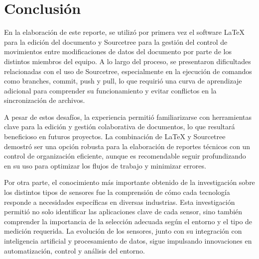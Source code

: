 \section{Conclusión}
En la elaboración de este reporte, se utilizó por primera vez el software LaTeX para la edición del documento y Sourcetree para la gestión del control de movimientos entre modificaciones de datos del documento por parte de los distintos miembros del equipo. A lo largo del proceso, se presentaron dificultades relacionadas con el uso de Sourcetree, especialmente en la ejecución de comandos como branches, commit, push y pull, lo que requirió una curva de aprendizaje adicional para comprender su funcionamiento y evitar conflictos en la sincronización de archivos.

A pesar de estos desafíos, la experiencia permitió familiarizarse con herramientas clave para la edición y gestión colaborativa de documentos, lo que resultará beneficioso en futuros proyectos. La combinación de LaTeX y Sourcetree demostró ser una opción robusta para la elaboración de reportes técnicos con un control de organización eficiente, aunque es recomendable seguir profundizando en su uso para optimizar los flujos de trabajo y minimizar errores.

Por otra parte, el conocimiento más importante obtenido de la investigación sobre los distintos tipos de sensores fue la comprensión de cómo cada tecnología responde a necesidades específicas en diversas industrias. Esta investigación permitió no solo identificar las aplicaciones clave de cada sensor, sino también comprender la importancia de la selección adecuada según el entorno y el tipo de medición requerida. La evolución de los sensores, junto con su integración con inteligencia artificial y procesamiento de datos, sigue impulsando innovaciones en automatización, control y análisis del entorno.







